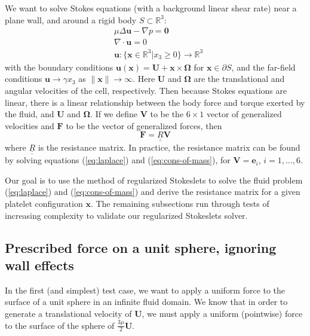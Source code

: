 \documentclass{article}
\def\R{\mathbb{R}}
\begin{document}
We want to solve Stokes equations (with a background linear shear
rate) near a plane wall, and around a rigid body $S \subset \R^3$:
\begin{align}
  &\mu \Delta \mathbf{u} - \nabla p =
    \boldsymbol{0} \label{eq:laplace} \\
  &\nabla \cdot \mathbf{u} = 0 \label{eq:cons-of-mass} \\
  &\mathbf{u}: \{\mathbf{x} \in
    \R^3 | x_3 \geq 0\} \rightarrow \R^3 \nonumber
\end{align}
with the boundary conditions
$\mathbf{u}(\mathbf{x}) = \mathbf{U} + \mathbf{x} \times
\mathbf{\Omega}$ for $\mathbf{x} \in \partial S$, and the far-field
conditions $\mathbf{u} \rightarrow \gamma x_3$ as
$\|\mathbf{x}\| \rightarrow \infty$. Here $\mathbf{U}$ and
$\mathbf{\Omega}$ are the translational and angular velocities of the
cell, respectively. Then because Stokes equations are linear, there is
a linear relationship between the body force and torque exerted by the
fluid, and $\mathbf{U}$ and $\mathbf{\Omega}$. If we define
$\mathbf{V}$ to be the $6 \times 1$ vector of generalized velocities
and $\mathbf{F}$ to be the vector of generalized forces, then
\begin{equation}
  \label{eq:resistance-eq}
  \mathbf{F} = \underline{\underline{R}} \mathbf{V} 
\end{equation}
where $\underline{\underline{R}}$ is the resistance matrix. In
practice, the resistance matrix can be found by solving equations
(\ref{eq:laplace}) and (\ref{eq:cons-of-mass}), for
$\mathbf{V} = \mathbf{e}_i$, $i = 1, \hdots, 6$.

Our goal is to use the method of regularized Stokeslets to solve the
fluid problem (\ref{eq:laplace}) and (\ref{eq:cons-of-mass}) and
derive the resistance matrix for a given platelet configuration
$\mathbf{x}$. The remaining subsections run through tests of
increasing complexity to validate our regularized Stokeslets solver.

\subsection{Prescribed force on a unit sphere, ignoring wall effects}
\label{sec:prescr-force-unit}

In the first (and simplest) test case, we want to apply a uniform
force to the surface of a unit sphere in an infinite fluid domain. We
know that in order to generate a translational velocity of
$\mathbf{U}$, we must apply a uniform (pointwise) force to the surface
of the sphere of $\frac{3\mu}{2}\mathbf{U}$.
\end{document}
